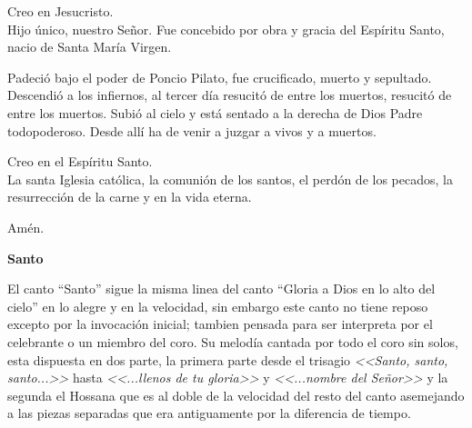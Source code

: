 \documentclass[12pt, letterpaper]{report}
\begin{document}
    \noindent
    Creo en Jesucristo. \\
    Hijo \'unico, nuestro Se\~nor. Fue concebido por obra y gracia del Esp\'iritu Santo, nacio de Santa Mar\'ia Virgen.

    \noindent
    Padeci\'o bajo el poder de Poncio Pilato, fue crucificado, muerto y sepultado. Descendi\'o a los infiernos, al tercer d\'ia resucit\'o de entre los muertos, resucit\'o de entre los muertos. Subi\'o al cielo y est\'a sentado a la derecha de Dios Padre todopoderoso. Desde all\'i ha de venir a juzgar a vivos y a muertos.

    \noindent
    Creo en el Esp\'iritu Santo.\\
    La santa Iglesia cat\'olica, la comuni\'on de los santos, el perd\'on de los pecados, la resurrecci\'on de la carne y en la vida eterna.

    \noindent
    Am\'en.
    \clearpage

    {%
\parindent 0pt
\noindent
\ifx\preLilyPondExample \undefined
\else
  \expandafter\preLilyPondExample
\fi
\def\lilypondbook{}%
%
\ifx\postLilyPondExample \undefined
\else
  \expandafter\postLilyPondExample
\fi
}
    \clearpage

    {%
\parindent 0pt
\noindent
\ifx\preLilyPondExample \undefined
\else
  \expandafter\preLilyPondExample
\fi
\def\lilypondbook{}%
%
\ifx\postLilyPondExample \undefined
\else
  \expandafter\postLilyPondExample
\fi
}
    \clearpage

    {%
\parindent 0pt
\noindent
\ifx\preLilyPondExample \undefined
\else
  \expandafter\preLilyPondExample
\fi
\def\lilypondbook{}%
%
\ifx\postLilyPondExample \undefined
\else
  \expandafter\postLilyPondExample
\fi
}
    \clearpage

    \begin{center}
      \LARGE \textbf{Santo}
    \end{center}

    \Large El canto ``Santo'' sigue la misma linea del canto ``Gloria a Dios en lo alto del cielo'' en lo alegre y en la velocidad, sin embargo este canto no tiene reposo excepto por la invocaci\'on inicial; tambien pensada para ser interpreta por el celebrante o un miembro del coro. Su melod\'ia cantada por todo el coro sin solos, esta dispuesta en dos parte, la primera parte desde el trisagio \textit{<<Santo, santo, santo...>>} hasta \textit{<<...llenos de tu gloria>>} y \textit{<<...nombre del Se\~nor>>} y la segunda el Hossana que es al doble de la velocidad del resto del canto asemejando a las piezas separadas que era antiguamente por la diferencia de tiempo.
\end{document}
